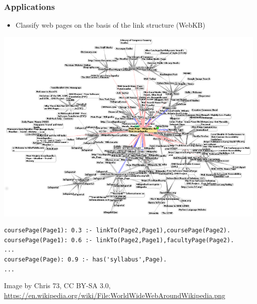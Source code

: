 \documentclass[trans]{beamer}
\begin{document}
\begin{frame}[fragile]
  \frametitle{Applications}
\begin{itemize}
\item Classify web pages on the basis of the link structure (WebKB)
  \end{itemize}
	\begin{center}
\includegraphics[scale=0.18]{800px-WorldWideWebAroundWikipedia.png}
\end{center}
\begin{scriptsize}
\begin{verbatim}
coursePage(Page1): 0.3 :- linkTo(Page2,Page1),coursePage(Page2).
coursePage(Page1): 0.6 :- linkTo(Page2,Page1),facultyPage(Page2).
...
coursePage(Page): 0.9 :- has('syllabus',Page).
...
\end{verbatim}
\end{scriptsize}
\begin{tiny}
Image by Chris 73, CC BY-SA 3.0, \url{https://en.wikipedia.org/wiki/File:WorldWideWebAroundWikipedia.png}
\end{tiny}

\end{frame}
\end{document}

